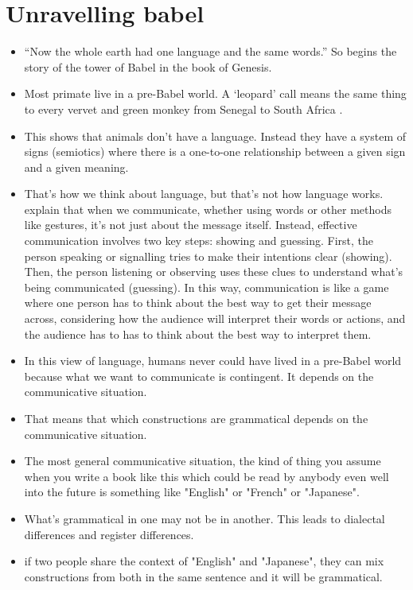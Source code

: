 \chapter{Unravelling babel}

\begin{itemize}
    \item ``Now the whole earth had one language and the same words.'' So begins the story of the tower of Babel in the book of Genesis. 
    \item Most primate live in a pre-Babel world. A `leopard' call means the same thing to every vervet and green monkey from Senegal to South Africa \citep{Price2014}.
    \item This shows that animals don't have a language. Instead they have a system of signs (semiotics) where there is a one-to-one relationship between a given sign and a given meaning.
    \item That's how we think about language, but that's not how language works. \citet{Smith2019a} explain that when we communicate, whether using words or other methods like gestures, it's not just about the message itself. Instead, effective communication involves two key steps: showing and guessing. First, the person speaking or signalling tries to make their intentions clear (showing). Then, the person listening or observing uses these clues to understand what's being communicated (guessing). In this way, communication is like a game where one person has to think about the best way to get their message across, considering how the audience will interpret their words or actions, and the audience has to has to think about the best way to interpret them.
    \item In this view of language, humans never could have lived in a pre-Babel world because what we want to communicate is contingent. It depends on the communicative situation.
    \item That means that which constructions are grammatical depends on the communicative situation.
    \item The most general communicative situation, the kind of thing you assume when you write a book like this which could be read by anybody even well into the future is something like "English" or "French" or "Japanese". 
    \item What's grammatical in one may not be in another. This leads to dialectal differences and register differences.
    \item if two people share the context of "English" and "Japanese", they can mix constructions from both in the same sentence and it will be grammatical.

\end{itemize}
